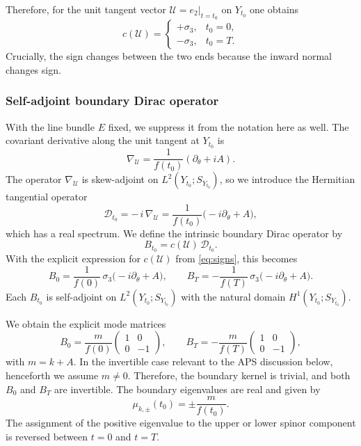 \documentclass[11pt]{article}
\theoremstyle{definition}
\numberwithin{equation}{section}
\begin{document}
 Therefore, for the unit tangent vector \(\mathcal{U}=e_2|_{t=t_0}\) on
\(Y_{t_0}\) one obtains
\begin{equation}    \label{eq:signs}
c(\mathcal{U})=
\begin{cases}
+\sigma_3,& t_0=0,\\
-\sigma_3,& t_0=T.
\end{cases}
\end{equation}
Crucially, the sign changes between the two ends because the inward normal changes sign.

\subsubsection{Self-adjoint boundary Dirac operator}\label{subsec:boundary-dirac}
With the line bundle \(E\) fixed, we suppress it from the notation here as well. The covariant derivative along the unit tangent at \(Y_{t_0}\) is
\begin{equation}
\nabla_\mathcal{U}=\frac{1}{f(t_0)}(\partial_\theta+iA).
\end{equation}
The operator \(\nabla_\mathcal{U}\) is skew-adjoint on \(L^2(Y_{t_0};S_{Y_{t_0}})\), so we introduce the Hermitian tangential operator
\begin{equation}
\mathcal{D}_{t_0} =-\,i\,\nabla_\mathcal{U}=\frac{1}{f(t_0)}\bigl(-i\partial_\theta + A\bigr),
\end{equation}
which has a real spectrum. We define the intrinsic boundary Dirac operator by
\begin{equation} \label{eq:30}
B_{t_0} =c(\mathcal{U})\,\mathcal{D}_{t_0}.
\end{equation} 
With the explicit expression for \(c(\mathcal{U})\) from \eqref{eq:signs}, this becomes
\begin{equation} \label{eq:31}
B_0=\frac{1}{f(0)}\,\sigma_3\bigl(-i\partial_\theta + A\bigr),\qquad
B_T=-\frac{1}{f(T)}\,\sigma_3\bigl(-i\partial_\theta + A\bigr).
\end{equation}
Each \(B_{t_0}\) is self-adjoint on \(L^2(Y_{t_0};S_{Y_{t_0}})\) with the natural domain
\(H^1(Y_{t_0};S_{Y_{t_0}})\).

We obtain the explicit mode matrices
\begin{equation} \label{eq:34}
B_0=\frac{m}{f(0)}\begin{pmatrix}1&0\\0&-1\end{pmatrix},\qquad
B_T=-\frac{m}{f(T)}\begin{pmatrix}1&0\\0&-1\end{pmatrix},
\end{equation} 
with \(m=k+A\). In the invertible case relevant to the APS discussion below, henceforth we assume \(m\neq 0\). Therefore, the boundary kernel is trivial, and both \(B_0\) and \(B_T\) are invertible.
The boundary eigenvalues are real and given by
\begin{equation}
\label{eq:mu}
\mu_{k,\pm}(t_0)=\pm \frac{m}{f(t_0)}.
\end{equation}
The assignment of the positive eigenvalue to the upper or lower spinor component is reversed between $t=0$ and $t=T$.
\end{document}
